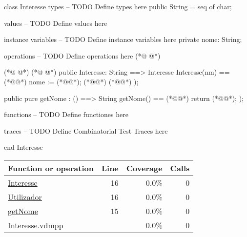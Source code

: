 \begin{vdmpp}[breaklines=true]
class Interesse
types
-- TODO Define types here
 public String = seq of char;
 
values
-- TODO Define values here

instance variables
-- TODO Define instance variables here
 private nome: String;
 
operations
-- TODO Define operations here
(*@
\label{getNome:15}
@*)

(*@
\label{Utilizador:16}
@*)
(*@
\label{Interesse:16}
@*)
 public Interesse: String ==> Interesse
 Interesse(nm) == (*@\vdmnotcovered{(}@*)
  nome := (*@@*);
  (*@@*) (*@@*)
 );
 
 public pure getNome : () ==> String
 getNome() ==
 (*@\vdmnotcovered{(}@*)
  return (*@@*);
 );
 
functions
-- TODO Define functiones here

traces
-- TODO Define Combinatorial Test Traces here

end Interesse
\end{vdmpp}
\bigskip
\begin{longtable}{|l|r|r|r|}
\hline
Function or operation & Line & Coverage & Calls \\
\hline
\hline
\hyperref[Interesse:16]{Interesse} & 16&0.0\% & 0 \\
\hline
\hyperref[Utilizador:16]{Utilizador} & 16&0.0\% & 0 \\
\hline
\hyperref[getNome:15]{getNome} & 15&0.0\% & 0 \\
\hline
\hline
Interesse.vdmpp & & 0.0\% & 0 \\
\hline
\end{longtable}

